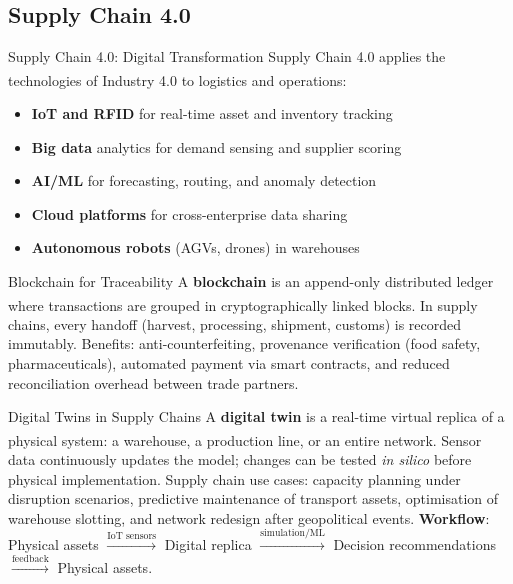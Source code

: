 \subsection{Supply Chain 4.0}


\begin{v3topic}{Supply Chain 4.0: Digital Transformation}
    Supply Chain 4.0 applies the technologies of Industry 4.0 to logistics and operations\textsuperscript{\cite[][pp.~17--22]{chopraSupplyChainManagement2019}}:
    \begin{itemize}
        \item \textbf{IoT and RFID} for real-time asset and inventory tracking
        \item \textbf{Big data} analytics for demand sensing and supplier scoring
        \item \textbf{AI/ML} for forecasting, routing, and anomaly detection
        \item \textbf{Cloud platforms} for cross-enterprise data sharing
        \item \textbf{Autonomous robots} (AGVs, drones) in warehouses
    \end{itemize}

\end{v3topic}
\begin{v3topic}{Blockchain for Traceability}
    A \textbf{blockchain} is an append-only distributed ledger where transactions are grouped in cryptographically linked blocks\textsuperscript{\cite[][pp.~8--9]{chopraSupplyChainManagement2019}}.
    In supply chains, every handoff (harvest, processing, shipment, customs) is recorded immutably.
    Benefits: anti-counterfeiting, provenance verification (food safety, pharmaceuticals), automated payment via smart contracts, and reduced reconciliation overhead between trade partners.

\end{v3topic}
\begin{v3topic}{Digital Twins in Supply Chains}
    A \textbf{digital twin} is a real-time virtual replica of a physical system: a warehouse, a production line, or an entire network\textsuperscript{\cite[][pp.~2403--2405]{bocewiczDigitalTwinManufacturing2021}}.
    Sensor data continuously updates the model; changes can be tested \emph{in silico} before physical implementation.
    Supply chain use cases: capacity planning under disruption scenarios, predictive maintenance of transport assets, optimisation of warehouse slotting, and network redesign after geopolitical events.
\visualseparator
    \textbf{Workflow}: Physical assets $\xrightarrow{\text{IoT sensors}}$ Digital replica $\xrightarrow{\text{simulation/ML}}$ Decision recommendations $\xrightarrow{\text{feedback}}$ Physical assets.

\end{v3topic}

